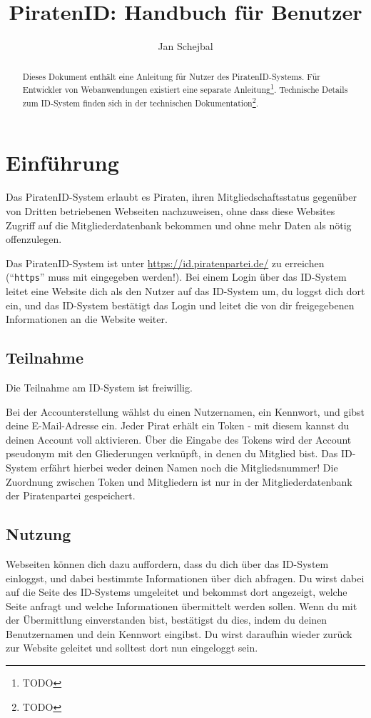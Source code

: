 \documentclass[parskip=half]{scrartcl}
\title{PiratenID: Handbuch für Benutzer}
\author{Jan Schejbal}
\date{}
\begin{document}
\maketitle

\begin{abstract}\noindent
Dieses Dokument enthält eine Anleitung für Nutzer des PiratenID-Systems.
Für Entwickler von Webanwendungen existiert eine separate Anleitung\footnote{TODO}.
Technische Details zum ID-System finden sich in der technischen Dokumentation\footnote{TODO}.
\end{abstract}


\section{Einführung}
Das PiratenID-System erlaubt es Piraten, ihren Mitgliedschaftsstatus gegenüber von Dritten betriebenen Webseiten nachzuweisen,
ohne dass diese Websites Zugriff auf die Mitgliederdatenbank bekommen und ohne mehr Daten als nötig offenzulegen.

Das PiratenID-System ist unter \url{https://id.piratenpartei.de/} zu erreichen ("`\texttt{https}"' muss mit eingegeben werden!).
Bei einem Login über das ID-System leitet eine Website dich als den Nutzer auf das ID-System um, du loggst dich dort ein,
und das ID-System bestätigt das Login und leitet die von dir freigegebenen Informationen an die Website weiter.

\subsection{Teilnahme}
Die Teilnahme am ID-System ist freiwillig.

Bei der Accounterstellung wählst du einen Nutzernamen, ein Kennwort, und gibst deine E-Mail-Adresse ein.
Jeder Pirat erhält ein Token - mit diesem kannst du deinen Account voll aktivieren.
Über die Eingabe des Tokens wird der Account pseudonym mit den Gliederungen verknüpft, in denen du Mitglied bist.
Das ID-System erfährt hierbei weder deinen Namen noch die Mitgliedsnummer!
Die Zuordnung zwischen Token und Mitgliedern ist nur in der Mitgliederdatenbank der Piratenpartei gespeichert.

\subsection{Nutzung}
Webseiten können dich dazu auffordern, dass du dich über das ID-System einloggst, und dabei bestimmte Informationen über dich abfragen.
Du wirst dabei auf die Seite des ID-Systems umgeleitet und bekommst dort angezeigt, welche Seite anfragt und welche Informationen übermittelt werden sollen.
Wenn du mit der Übermittlung einverstanden bist, bestätigst du dies, indem du deinen Benutzernamen und dein Kennwort eingibst.
Du wirst daraufhin wieder zurück zur Website geleitet und solltest dort nun eingeloggt sein.
\end{document}

